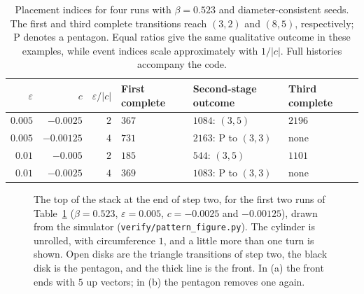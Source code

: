 \documentclass[11pt]{amsart}
\theoremstyle{definition}
\newcommand{\eps}{\varepsilon}
\begin{document}
\begin{table}[t]
\centering\small
\begin{tabular}{@{}rrrlll@{}}
\toprule
$\eps$ & $c$ & $\eps/|c|$ & First complete & Second-stage outcome & Third complete\\
\midrule
$0.005$ & $-0.0025$ & $2$ & $367$ & $1084$: $(3,5)$ & $2196$\\
$0.005$ & $-0.00125$ & $4$ & $731$ & $2163$: P to $(3,3)$ & none\\
$0.01$ & $-0.005$ & $2$ & $185$ & $544$: $(3,5)$ & $1101$\\
$0.01$ & $-0.0025$ & $4$ & $369$ & $1083$: P to $(3,3)$ & none\\
\bottomrule
\end{tabular}
\caption{Placement indices for four runs with $\beta=0.523$ and diameter-consistent seeds.
The first and third complete transitions reach $(3,2)$ and $(8,5)$, respectively; P denotes
a pentagon. Equal ratios give the same qualitative outcome in these examples, while event
indices scale approximately with $1/|c|$. Full histories accompany the code.}\label{tab:example}
\end{table}

\begin{figure}[t]
\centering
{}
\caption{The top of the stack at the end of step two, for the first two runs of Table~\ref{tab:example}
($\beta=0.523$, $\eps=0.005$, $c=-0.0025$ and $-0.00125$), drawn from the simulator (\texttt{verify/pattern\_figure.py}). The cylinder
is unrolled, with circumference $1$, and a little more than one turn is shown. Open disks are the triangle
transitions of step two, the black disk is the pentagon, and the thick line is the front. In (a) the
front ends with $5$ up vectors; in (b) the pentagon removes one again.}\label{fig:pattern}
\end{figure}
\end{document}
